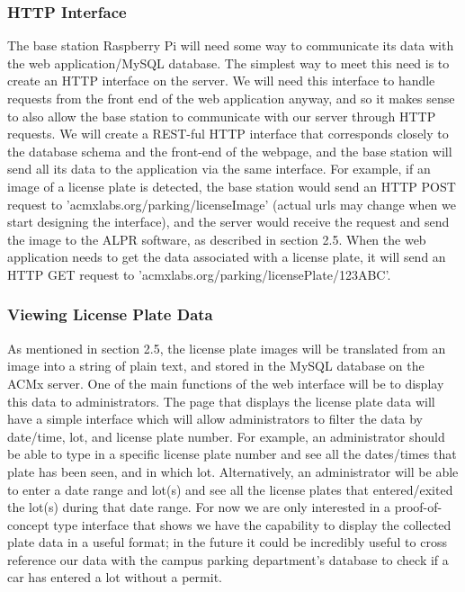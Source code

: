 \documentclass[11pt, oneside, fullpage, doublespace]{article}
\begin{document}
\subsubsection{HTTP Interface}
The base station Raspberry Pi will need some way to communicate its data with the web application/MySQL database. The simplest way to meet this need is to create an HTTP interface on the server. We will need this interface to handle requests from the front end of the web application anyway, and so it makes sense to also allow the base station to communicate with our server through HTTP requests. We will create a REST-ful HTTP interface that corresponds closely to the database schema and the front-end of the webpage, and the base station will send all its data to the application via the same interface. For example, if an image of a license plate is detected, the base station would send an HTTP POST request to 'acmxlabs.org/parking/licenseImage' (actual urls may change when we start designing the interface), and the server would receive the request and send the image to the ALPR software, as described in section 2.5. When the web application needs to get the data associated with a license plate, it will send an HTTP GET request to 'acmxlabs.org/parking/licensePlate/123ABC'.

\subsubsection{Viewing License Plate Data}
As mentioned in section 2.5, the license plate images will be translated from an image into a string of plain text, and stored in the MySQL database on the ACMx server. One of the main functions of the web interface will be to display this data to administrators. The page that displays the license plate data will have a simple interface which will allow administrators to filter the data by date/time, lot, and license plate number. For example, an administrator should be able to type in a specific license plate number and see all the dates/times that plate has been seen, and in which lot. Alternatively, an administrator will be able to enter a date range and lot(s) and see all the license plates that entered/exited the lot(s) during that date range. For now we are only interested in a proof-of-concept type interface that shows we have the capability to display the collected plate data in a useful format; in the future it could be incredibly useful to cross reference our data with the campus parking department's database to check if a car has entered a lot without a permit.
\end{document}
